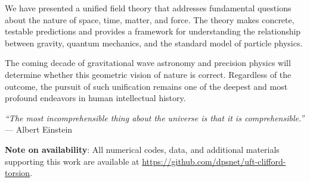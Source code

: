 We have presented a unified field theory that addresses fundamental questions about the nature of space, time, matter, and force. The theory makes concrete, testable predictions and provides a framework for understanding the relationship between gravity, quantum mechanics, and the standard model of particle physics.

The coming decade of gravitational wave astronomy and precision physics will determine whether this geometric vision of nature is correct. Regardless of the outcome, the pursuit of such unification remains one of the deepest and most profound endeavors in human intellectual history.

\begin{center}
\textit{``The most incomprehensible thing about the universe is that it is comprehensible.''}\\
--- Albert Einstein
\end{center}

\vspace{1cm}

\noindent\textbf{Note on availability}: All numerical codes, data, and additional materials supporting this work are available at \url{https://github.com/dpsnet/uft-clifford-torsion}.
